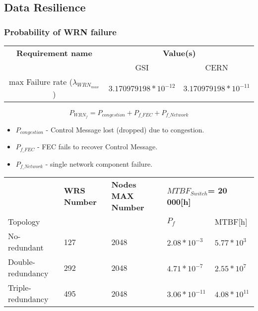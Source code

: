 \documentclass[]{beamer}
\begin{document}
\subsection{Data Resilience}
\begin{frame}
  \frametitle{Probability of WRN failure}   
{\tiny
\begin{table}[ht]
	\begin{tabular}{| c | c | c |}          \hline
\textbf{Requirement name}& \multicolumn{2}{|c|}{\textbf{Value(s)}}  \\
                         & GSI              & CERN          \\ \hline
max Failure rate ($\lambda_{WRN_{max}}$) & $3.170979198*10^{-12}$ &
$3.170979198*10^{-11}$  \\ \hline
\end{tabular}
\label{tab:requirements}
\end{table}
}


\begin{equation}
  \label{equation:WRreliability}
     P_{WRN_f} =  P_{congestion} + P_{f\_FEC} + P_{f\_Network}
\end{equation}
{\small
\begin{itemize}
        \item $P_{congestion}$ - Control Message lost (dropped) due to congestion.
        \item $P_{f\_FEC}$ - FEC fails to recover Control Message.
        \item $P_{f\_Network}$ - single network component failure. 
\end{itemize}
}
{\tiny
\begin{table}[ht]
\begin{tabular}{|p{2cm}|p{1cm}|p{1cm}|p{1.5cm}|p{1.5cm}|}        \hline
& \textbf{WRS Number} &
\textbf{Nodes MAX Number} &  
\multicolumn{2}{|p{3cm}|}{\textbf{$MTBF_{Switch}$=  20 000[h] }} \\
Topology & & & $P_f$ & MTBF[h]  \\ \hline

No-redundant &  127 &  2048  
& $ 2.08*10^{-3}$  & $ 5.77*10^{3}$
 \\ \hline

Double-redundancy &  292 &  2048  
& $ 4.71*10^{-7}$  &  $ 2.55*10^{7}$
   \\ \hline

Triple-redundancy &  495  & 2048    
& $ 3.06*10^{-11}$  &  $ 4.08*10^{11}$
  \\ \hline
\end{tabular}
\end{table}
}

\end{frame}
\end{document}
